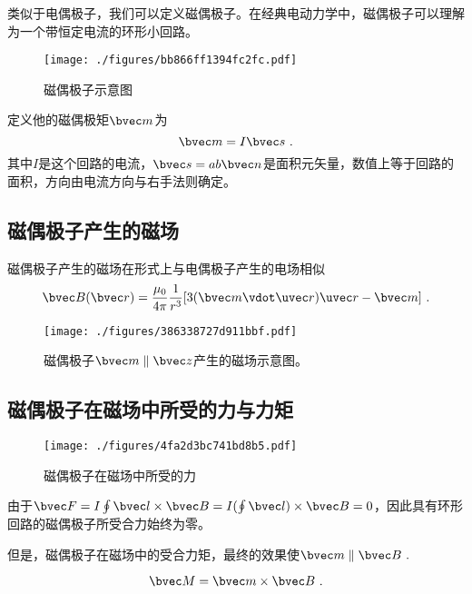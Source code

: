 
\begin{issues}
\issueDraft
\end{issues}
类似于电偶极子，我们可以定义磁偶极子。在经典电动力学中，磁偶极子可以理解为一个带恒定电流的环形小回路。
\begin{figure}[ht]
\centering
\texttt{[image: ./figures/bb866ff1394fc2fc.pdf]}
\caption{磁偶极子示意图} \label{fig_Bdipol_1}
\end{figure}

定义他的磁偶极矩$\bvec m$为
\begin{equation}
\bvec m = I \bvec s~.
\end{equation}
其中$I$是这个回路的电流，$\bvec s = ab\bvec n$是面积元矢量，数值上等于回路的面积，方向由电流方向与右手法则确定。

\subsection{磁偶极子产生的磁场}
磁偶极子产生的磁场在形式上与电偶极子产生的电场相似
\begin{equation}
\bvec B(\bvec r) = \frac{\mu_0}{4\pi} \frac{1}{r^3} [3(\bvec m \vdot \uvec r) \uvec r - \bvec m]~.
\end{equation}
\begin{figure}[ht]
\centering
\texttt{[image: ./figures/386338727d911bbf.pdf]}
\caption{磁偶极子$\bvec m \parallel \bvec z $产生的磁场示意图。} \label{fig_Bdipol_3}
\end{figure}

\subsection{磁偶极子在磁场中所受的力与力矩}
\begin{figure}[ht]
\centering
\texttt{[image: ./figures/4fa2d3bc741bd8b5.pdf]}
\caption{磁偶极子在磁场中所受的力} \label{fig_Bdipol_2}
\end{figure}
由于$\bvec F = I \oint \bvec l \times \bvec B = I (\oint \bvec l) \times \bvec B = 0$，因此具有环形回路的磁偶极子所受合力始终为零。

但是，磁偶极子在磁场中的受合力矩，最终的效果使$\bvec m \parallel \bvec B~.$

\begin{equation}
\bvec M = \bvec m \times \bvec B~.
\end{equation}
